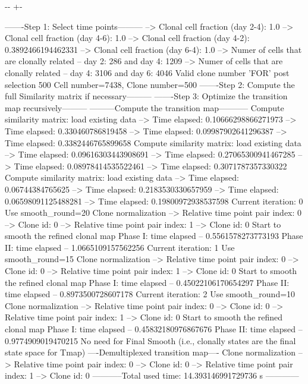 \documentclass[letterpaper,10pt,english]{sphinxmanual}
\newlength\nbsphinxcodecellspacing
\begin{document}
{

\kern-\sphinxverbatimsmallskipamount\kern-\baselineskip
\kern+\FrameHeightAdjust\kern-\fboxrule
\vspace{\nbsphinxcodecellspacing}

\begin{sphinxVerbatim}[commandchars=\\\{\}]
-------Step 1: Select time points---------
--> Clonal cell fraction (day 2-4): 1.0
--> Clonal cell fraction (day 4-6): 1.0
--> Clonal cell fraction (day 4-2): 0.3892466194462331
--> Clonal cell fraction (day 6-4): 1.0
--> Numer of cells that are clonally related -- day 2: 286  and day 4: 1209
--> Numer of cells that are clonally related -- day 4: 3106  and day 6: 4046
Valid clone number 'FOR' post selection 500
Cell number=7438, Clone number=500
-------Step 2: Compute the full Similarity matrix if necessary---------
-------Step 3: Optimize the transition map recursively---------
---------Compute the transition map-----------
Compute similarity matrix: load existing data
--> Time elapsed:  0.10666298866271973
--> Time elapsed:  0.330460786819458
--> Time elapsed:  0.09987902641296387
--> Time elapsed:  0.3382446765899658
Compute similarity matrix: load existing data
--> Time elapsed:  0.09616303443908691
--> Time elapsed:  0.27065300941467285
--> Time elapsed:  0.08978414535522461
--> Time elapsed:  0.3071787357330322
Compute similarity matrix: load existing data
--> Time elapsed:  0.06744384765625
--> Time elapsed:  0.2183530330657959
--> Time elapsed:  0.06598091125488281
--> Time elapsed:  0.19800972938537598
Current iteration: 0
Use smooth\_round=20
Clone normalization
--> Relative time point pair index: 0
--> Clone id: 0
--> Relative time point pair index: 1
--> Clone id: 0
Start to smooth the refined clonal map
Phase I: time elapsed --  0.5561578273773193
Phase II: time elapsed --  1.0665109157562256
Current iteration: 1
Use smooth\_round=15
Clone normalization
--> Relative time point pair index: 0
--> Clone id: 0
--> Relative time point pair index: 1
--> Clone id: 0
Start to smooth the refined clonal map
Phase I: time elapsed --  0.45022106170654297
Phase II: time elapsed --  0.8973500728607178
Current iteration: 2
Use smooth\_round=10
Clone normalization
--> Relative time point pair index: 0
--> Clone id: 0
--> Relative time point pair index: 1
--> Clone id: 0
Start to smooth the refined clonal map
Phase I: time elapsed --  0.45832180976867676
Phase II: time elapsed --  0.9774909019470215
No need for Final Smooth (i.e., clonally states are the final state space for Tmap)
----Demultiplexed transition map----
Clone normalization
--> Relative time point pair index: 0
--> Clone id: 0
--> Relative time point pair index: 1
--> Clone id: 0
-----------Total used time: 14.393146991729736 s ------------
\end{sphinxVerbatim}
}
\end{document}
